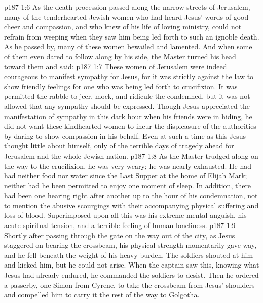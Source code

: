 \vs p187 1:6 \pc As the death procession passed along the narrow streets of Jerusalem, many of the tenderhearted Jewish women who had heard Jesus’ words of good cheer and compassion, and who knew of his life of loving ministry, could not refrain from weeping when they saw him being led forth to such an ignoble death. As he passed by, many of these women bewailed and lamented. And when some of them even dared to follow along by his side, the Master turned his head toward them and said: 
\vs p187 1:7 These women of Jerusalem were indeed courageous to manifest sympathy for Jesus, for it was strictly against the law to show friendly feelings for one who was being led forth to crucifixion. It was permitted the rabble to jeer, mock, and ridicule the condemned, but it was not allowed that any sympathy should be expressed. Though Jesus appreciated the manifestation of sympathy in this dark hour when his friends were in hiding, he did not want these kindhearted women to incur the displeasure of the authorities by daring to show compassion in his behalf. Even at such a time as this Jesus thought little about himself, only of the terrible days of tragedy ahead for Jerusalem and the whole Jewish nation.
\vs p187 1:8 As the Master trudged along on the way to the crucifixion, he was very weary; he was nearly exhausted. He had had neither food nor water since the Last Supper at the home of Elijah Mark; neither had he been permitted to enjoy one moment of sleep. In addition, there had been one hearing right after another up to the hour of his condemnation, not to mention the abusive scourgings with their accompanying physical suffering and loss of blood. Superimposed upon all this was his extreme mental anguish, his acute spiritual tension, and a terrible feeling of human loneliness.
\vs p187 1:9 Shortly after passing through the gate on the way out of the city, as Jesus staggered on bearing the crossbeam, his physical strength momentarily gave way, and he fell beneath the weight of his heavy burden. The soldiers shouted at him and kicked him, but he could not arise. When the captain saw this, knowing what Jesus had already endured, he commanded the soldiers to desist. Then he ordered a passerby, one Simon from Cyrene, to take the crossbeam from Jesus’ shoulders and compelled him to carry it the rest of the way to Golgotha.
